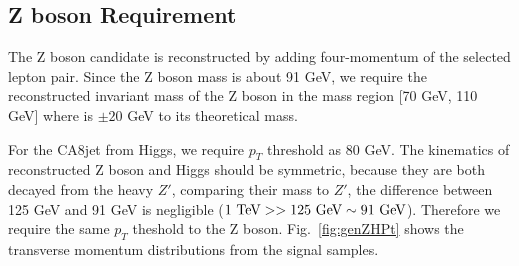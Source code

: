 \subsection{Z boson Requirement}
The Z boson candidate is reconstructed by adding four-momentum of the selected lepton pair. Since the Z boson mass is about 91 GeV, we require the reconstructed invariant mass of the Z boson in the mass region [70 GeV, 110 GeV] where is $\pm 20$ GeV to its theoretical mass.

For the CA8jet from Higgs, we require $p_{T}$ threshold as 80 GeV. The kinematics of reconstructed Z boson and Higgs should be symmetric, because they are both decayed from the heavy $Z'$, comparing their mass to $Z'$, the difference between 125 GeV and 91 GeV is negligible ($1\textup{ TeV} >> 125 \textup{ GeV} \sim 91 \textup{ GeV}$). Therefore we require the same $p_{T}$ theshold to the Z boson. Fig.~\ref{fig:genZHPt} shows the transverse momentum distributions from the signal samples.

